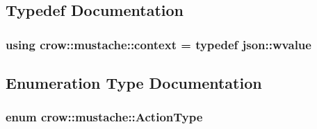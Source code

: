 \subsection{Typedef Documentation}
\hypertarget{namespacecrow_1_1mustache_ae1f8ebbbcd4c41b97a2aebb247a123f9}{
\subsubsection[{context}]{\setlength{\rightskip}{0pt plus 5cm}using {\bf crow\-::mustache\-::context} = typedef {\bf json\-::wvalue}}}\label{namespacecrow_1_1mustache_ae1f8ebbbcd4c41b97a2aebb247a123f9}


\subsection{Enumeration Type Documentation}
\hypertarget{namespacecrow_1_1mustache_aeb8da2ae9d8d9fe55f6ab0a7455dd667}{
\subsubsection[{Action\-Type}]{\setlength{\rightskip}{0pt plus 5cm}enum {\bf crow\-::mustache\-::\-Action\-Type}\hspace{0.3cm}{\ttfamily [strong]}}}\label{namespacecrow_1_1mustache_aeb8da2ae9d8d9fe55f6ab0a7455dd667}
